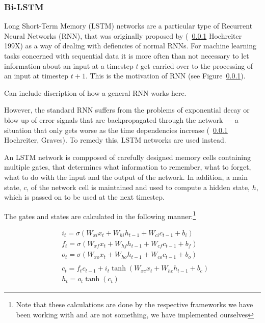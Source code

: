 \subsubsection{Bi-LSTM}

Long Short-Term Memory (LSTM) networks are a particular type of Recurrent Neural
Networks (RNN), that was originally proposed by (~\ref{} Hochreiter 199X) as a
way of dealing with defiencies of normal RNNs. For machine learning tasks
concerned with sequential data it is more often than not necessary to let
information about an input at a timestep $t$ get carried over to the processing
of an input at timestep $t+1$. This is the motivation of RNN (see
Figure~\ref{}).

Can include discription of how a general RNN works here. %

However, the standard RNN suffers from the problems of exponential decay or blow
up of error signals that are backpropagated through the network --- a situation
that only gets worse as the time dependencies increase (~\ref{} Hochreiter,
Graves). To remedy this, LSTM networks are used instead.

An LSTM network is compposed of carefully designed memory cells containing
multiple gates, that determines what information to remember, what to forget,
what to do with the input and the output of the network. In addition, a main
state, $c$, of the network cell is maintained and used to compute a hidden
state, $h$, which is passed on to be used at the next timestep.

The gates and states are calculated in the following manner:\footnote{Note that
    these calculations are done by the respective frameworks we have been
working with and are not something, we have implemented ourselves}

\begin{align*}
    & i_{t} = \sigma(W_{xi}x_{t} + W_{hi}h_{t-1} + W_{ci}c_{t-1} + b_{i})    \\
    & f_{t} = \sigma(W_{xf}x_{t} + W_{hf}h_{t-1} + W_{cf}c_{t-1} + b_{f})    \\
    & o_{t} = \sigma(W_{xo}x_{t} + W_{ho}h_{t-1} + W_{co}c_{t-1} + b_{o})    \\ \\
    & c_{t} = f_{t}c_{t-1} + i_{t}\tanh(W_{xc}x_{t} + W_{hc}h_{t-1} + b_{c}) \\
    & h_{t} = o_{t}\tanh(c_{t})
\end{align*}

